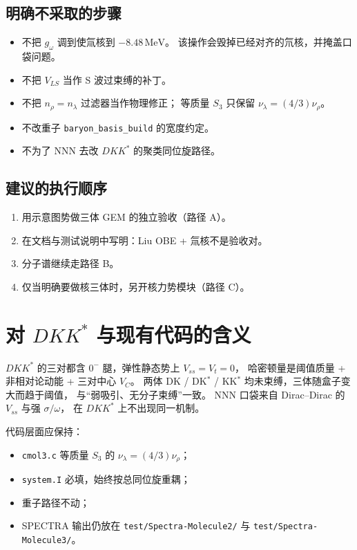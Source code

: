 \documentclass[12pt,a4paper]{article}
\newcommand{\MeV}{\,\mathrm{MeV}}
\begin{document}
\subsection{明确不采取的步骤}

\begin{itemize}
  \item 不把 $g_\omega$ 调到使氚核到 $-8.48\MeV$。
        该操作会毁掉已经对齐的氘核，并掩盖口袋问题。
  \item 不把 $V_{LS}$ 当作 S 波过束缚的补丁。
  \item 不把 $n_\rho=n_\lambda$ 过滤器当作物理修正；
        等质量 $S_3$ 只保留 $\nu_\lambda=(4/3)\nu_\rho$。
  \item 不改重子 \texttt{baryon\_basis\_build} 的宽度约定。
  \item 不为了 NNN 去改 $DKK^*$ 的聚类同位旋路径。
\end{itemize}

\subsection{建议的执行顺序}

\begin{enumerate}
  \item 用示意图势做三体 GEM 的独立验收（路径 A）。
  \item 在文档与测试说明中写明：Liu OBE + 氚核不是验收对。
  \item 分子谱继续走路径 B。
  \item 仅当明确要做核三体时，另开核力势模块（路径 C）。
\end{enumerate}

\section{\texorpdfstring{对 $DKK^*$ 与现有代码的含义}{对 DKK* 与现有代码的含义}}

$DKK^*$ 的三对都含 $0^-$ 腿，弹性静态势上 $V_{ss}=V_t=0$，
哈密顿量是阈值质量 + 非相对论动能 + 三对中心 $V_C$。
两体 DK / DK$^*$ / KK$^*$ 均未束缚，三体随盒子变大而趋于阈值，
与``弱吸引、无分子束缚''一致。
NNN 口袋来自 Dirac--Dirac 的 $V_{ss}$ 与强 $\sigma/\omega$，
在 $DKK^*$ 上不出现同一机制。

代码层面应保持：
\begin{itemize}
  \item \texttt{cmol3.c} 等质量 $S_3$ 的 $\nu_\lambda=(4/3)\nu_\rho$；
  \item \texttt{system.I} 必填，始终按总同位旋重耦；
  \item 重子路径不动；
  \item SPECTRA 输出仍放在 \texttt{test/Spectra-Molecule2/} 与
        \texttt{test/Spectra-Molecule3/}。
\end{itemize}
\end{document}
